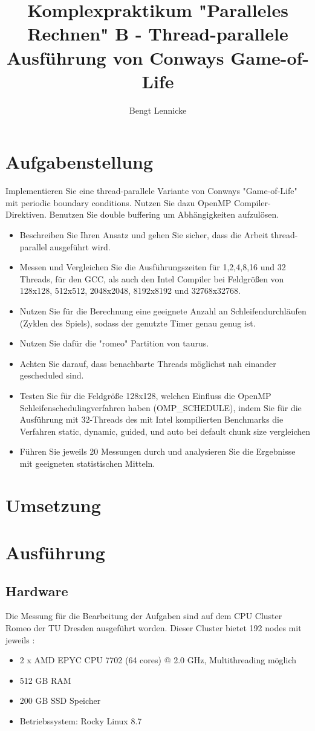 \documentclass[plainarticle,zihtitle,german,final,hyperref,utf8]{zihpub}
\author{Bengt Lennicke}
\title{Komplexpraktikum "Paralleles Rechnen" \newline B - Thread-parallele Ausführung von Conways Game-of-Life}
\begin{document}
\section{Aufgabenstellung}
Implementieren Sie eine thread-parallele Variante von Conways "Game-of-Life" mit periodic boundary conditions. Nutzen Sie dazu OpenMP Compiler-Direktiven. Benutzen Sie double buffering um Abhängigkeiten aufzulösen.

\begin{itemize}
	\item Beschreiben Sie Ihren Ansatz und gehen Sie sicher, dass die Arbeit thread-parallel ausgeführt wird.
	\item Messen und Vergleichen Sie die Ausführungszeiten für 1,2,4,8,16 und 32 Threads, für den GCC, als auch den Intel Compiler bei Feldgrößen von 128x128, 512x512, 2048x2048, 8192x8192 und 32768x32768.
	\item Nutzen Sie für die Berechnung eine geeignete Anzahl an Schleifendurchläufen (Zyklen des Spiels), sodass der genutzte Timer genau genug ist.
	\item Nutzen Sie dafür die "romeo" Partition von taurus.
	\item Achten Sie darauf, dass benachbarte Threads möglichst nah einander gescheduled sind.
	\item Testen Sie für die Feldgröße 128x128, welchen Einfluss die OpenMP Schleifenschedulingverfahren haben (OMP\_SCHEDULE), indem Sie für die Ausführung mit 32-Threads des mit Intel kompilierten Benchmarks die Verfahren static, dynamic, guided, und auto bei default chunk size vergleichen
	\item Führen Sie jeweils 20 Messungen durch und analysieren Sie die Ergebnisse mit geeigneten statistischen Mitteln.
\end{itemize}

\section{Umsetzung}
\section{Ausführung}
\subsection{Hardware}
Die Messung für die Bearbeitung der Aufgaben sind auf dem CPU Cluster Romeo der TU Dresden ausgeführt worden. Dieser Cluster bietet 192 nodes mit jeweils \cite{hpc_compendium}:
\begin{itemize}
	\item 2 x AMD EPYC CPU 7702 (64 cores) @ 2.0 GHz, Multithreading möglich
	\item 512 GB RAM
	\item 200 GB SSD Speicher
	\item Betriebssystem: Rocky Linux 8.7
\end{itemize}
\end{document}
